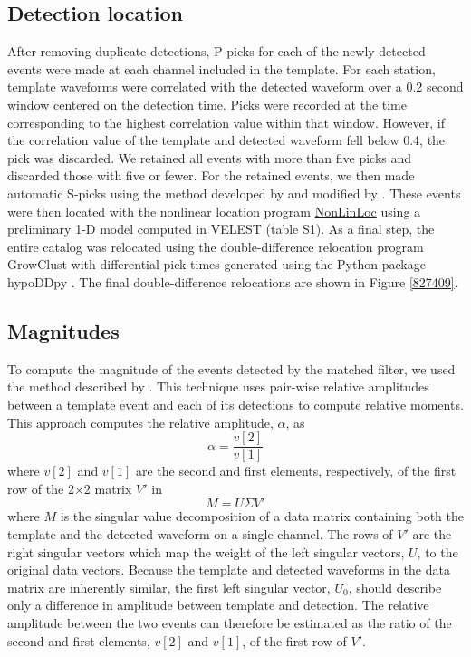 \subsection{Detection location} \label{methods_location}
After removing duplicate detections, P-picks for each of the newly detected
events were made at each channel included in the template. For each station, template waveforms were correlated with the detected waveform over a 0.2 second window centered on the detection time. Picks were recorded at the time corresponding to the highest correlation value within that window. However, if the correlation value of the template and detected waveform fell below 0.4, the pick was discarded. We retained all events with more than five picks and discarded those with five or fewer. For the retained events, we then made automatic S-picks \citep{mroczek2016shear} using the method developed by \citet{Diehl_2009} and modified by \citet{Castellazzi_2015}. These events were then located with the nonlinear location program \href{http://alomax.free.fr/nlloc/}{NonLinLoc} \citep{Lomax_2014} using a preliminary 1-D model computed in VELEST \citep{Kissling_1994,sewell2017}(table S1). As a final step, the entire catalog was relocated using the double-difference relocation program GrowClust \citep{Trugman_2017} with differential pick times generated using the Python package hypoDDpy \citep{lion_krischer_2015_18907}. The final double-difference relocations are shown in Figure \ref{827409}.

\subsection{Magnitudes} \label{methods_magnitudes}
To compute the magnitude of the events detected by the matched filter,
we used the method described by \citet{Shelly_2016}. This technique uses pair-wise relative amplitudes between a template event and each of its detections to compute relative moments. This approach computes the relative amplitude, $\alpha$, as
\begin{equation}
\alpha = \frac{v[2]}{v[1]}
\end{equation}
where $v[2]$ and $v[1]$ are the second and first elements, respectively, of the first row of the 2$\times$2 matrix $V'$ in
\begin{equation}
M = U\Sigma V'
\end{equation}
where $M$ is the singular value decomposition of a data matrix containing both the template and the detected waveform on a single channel. The rows of $V'$ are the right singular vectors which map the weight of the left singular vectors, $U$, to the original data vectors. Because the template and detected waveforms in the data matrix are inherently similar, the first left singular vector, $U_0$, should describe only a difference in amplitude between template and detection. The relative amplitude between the two events can therefore be estimated as the ratio of the second and first elements, $v[2]$ and $v[1]$, of the first row of $V'$.

